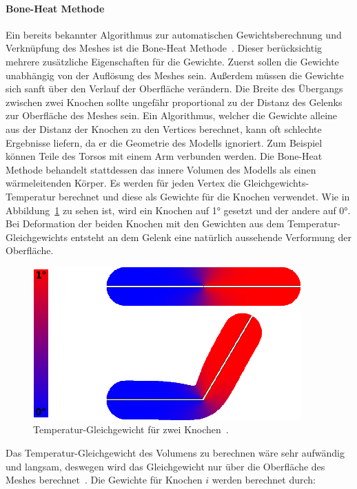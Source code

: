 \paragraph{Bone-Heat Methode}
Ein bereits bekannter Algorithmus zur automatischen Gewichtsberechnung und Verknüpfung des Meshes ist die Bone-Heat Methode~\cite{bone_heat_paper}. Dieser berücksichtig mehrere zusätzliche Eigenschaften für die Gewichte. Zuerst sollen die Gewichte unabhängig von der Auflösung des Meshes sein. Außerdem müssen die Gewichte sich sanft über den Verlauf der Oberfläche verändern. Die Breite des Übergangs zwischen zwei Knochen sollte ungefähr proportional zu der Distanz des Gelenks zur Oberfläche des Meshes sein.
Ein Algorithmus, welcher die Gewichte alleine aus der Distanz der Knochen zu den Vertices berechnet, kann oft schlechte Ergebnisse liefern, da er die Geometrie des Modells ignoriert. Zum Beispiel können Teile des Torsos mit einem Arm verbunden werden. Die Bone-Heat Methode behandelt stattdessen das innere Volumen des Modells als einen wärmeleitenden Körper. Es werden für jeden Vertex die Gleichgewichts-Temperatur berechnet und diese als Gewichte für die Knochen verwendet. Wie in Abbildung~\ref{fig:bone_heat_equilibrium} zu sehen ist, wird ein Knochen auf 1° gesetzt und der andere auf 0°. Bei Deformation der beiden Knochen mit den Gewichten aus dem Temperatur-Gleichgewichts entsteht an dem Gelenk eine natürlich aussehende Verformung der Oberfläche.

\begin{figure}[h!]
	\centering
	\includegraphics[width=0.7\linewidth]{resources/img/bone_heat_equilibrium.png}
	\caption{Temperatur-Gleichgewicht für zwei Knochen~\cite{bone_heat_paper}.}
	\label{fig:bone_heat_equilibrium}
\end{figure}

Das Temperatur-Gleichgewicht des Volumens zu berechnen wäre sehr aufwändig und langsam, deswegen wird das Gleichgewicht nur über die Oberfläche des Meshes berechnet~\cite[S.~6]{bone_heat_paper}. Die Gewichte für Knochen $i$ werden berechnet durch:

